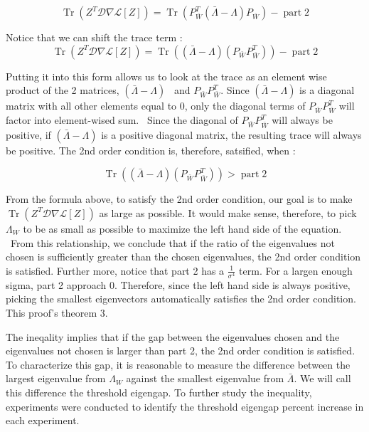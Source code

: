 \documentclass{article}
\newcommand{\tmop}[1]{\ensuremath{\operatorname{#1}}}
\begin{document}
\[ \tmop{Tr} ( Z^T \mathcal{D} \nabla \mathcal{L} [ Z]) = \tmop{Tr} (
   P_{\bar{W}}^T  ( \bar{\Lambda} - \Lambda) P_{\bar{W}} ) - \tmop{part} 2 \]


Notice that we can shift the trace term :
\[ \tmop{Tr} ( Z^T \mathcal{D} \nabla \mathcal{L} [ Z]) = \tmop{Tr} ( (
   \bar{\Lambda} - \Lambda)  ( P_{\bar{W}} P_{\bar{W}}^T) ) - \tmop{part} 2 \]


Putting it into this form allows us to look at the trace as an element wise
product of the 2 matrices, $( \bar{\Lambda} - \Lambda) $ \ and $P_{\bar{W}}
P_{\bar{W}}^T $. Since $( \bar{\Lambda} - \Lambda) $ is a diagonal matrix with
all other elements equal to 0, only the diagonal terms of $P_{\bar{W}}
P_{\bar{W}}^T $ will factor into element-wised sum. \ Since the diagonal of
$P_{\bar{W}} P_{\bar{W}}^T $ will always be positive, if $( \bar{\Lambda} -
\Lambda) $ is a positive diagonal matrix, the resulting trace will always be
positive. The 2nd order condition is, therefore, satsified, when :


\begin{equation}
  \tmop{Tr} ( ( \bar{\Lambda} - \Lambda)  ( P_{\bar{W}} P_{\bar{W}}^T) ) >
  \tmop{part} 2
\end{equation}




From the formula above, to satisfy the 2nd order condition, our goal is to
make $\tmop{Tr} ( Z^T \mathcal{D} \nabla \mathcal{L} [ Z])$ as large as
possible. It would make sense, therefore, to pick $\Lambda_W$ to be as small
as possible to maximize the left hand side of the equation. \ From this
relationship, we conclude that if the ratio of the eigenvalues not chosen is
sufficiently greater than the chosen eigenvalues, the 2nd order condition is
satisfied. Further more, notice that part 2 has a $\frac{1}{\sigma^4}$ term.
For a largen enough sigma, part 2 approach 0. Therefore, since the left hand
side is always positive, picking the smallest eigenvectors automatically
satisfies the 2nd order condition. This proof's theorem 3.



The ineqality implies that if the gap between the eigenvalues chosen and the
eigenvalues not chosen is larger than part 2, the 2nd order condition is
satisfied. To characterize this gap, it is reasonable to measure the
difference between the largest eigenvalue from $\Lambda_W$ against the
smallest eigenvalue from $\bar{\Lambda}$. We will call this difference the
threshold eigengap. To further study the inequality, experiments were
conducted to identify the threshold eigengap percent increase in each
experiment.
\end{document}
